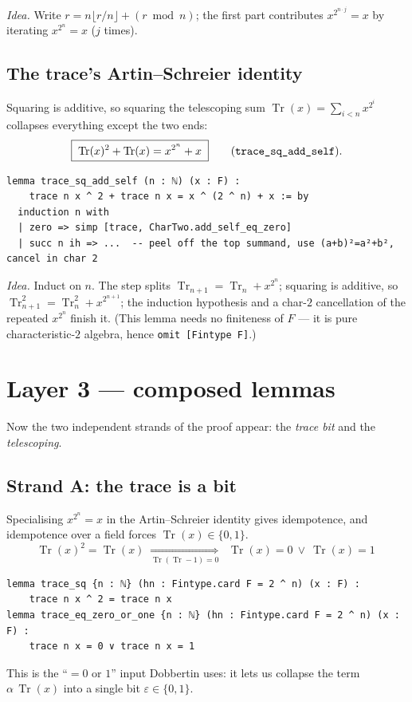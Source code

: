\documentclass[11pt]{article}
\newcommand{\lc}[1]{\texttt{#1}}
\newcommand{\Tr}{\operatorname{Tr}}
\begin{document}
\noindent\emph{Idea.}  Write $r=n\lfloor r/n\rfloor+(r\bmod n)$; the first part
contributes $x^{2^{n\cdot j}}=x$ by iterating $x^{2^n}=x$ ($j$ times).

\subsection{The trace's Artin--Schreier identity}
Squaring is additive, so squaring the telescoping sum $\Tr(x)=\sum_{i<n}x^{2^i}$
collapses everything except the two ends:
\[
  \boxed{\;\Tr(x)^2+\Tr(x)=x^{2^n}+x\;}
  \qquad\text{(\lc{trace\_sq\_add\_self})}.
\]

\begin{lstlisting}
lemma trace_sq_add_self (n : ℕ) (x : F) :
    trace n x ^ 2 + trace n x = x ^ (2 ^ n) + x := by
  induction n with
  | zero => simp [trace, CharTwo.add_self_eq_zero]
  | succ n ih => ...  -- peel off the top summand, use (a+b)²=a²+b², cancel in char 2
\end{lstlisting}

\noindent\emph{Idea.}  Induct on $n$.  The step splits
$\Tr_{n+1}=\Tr_n+x^{2^n}$; squaring is additive, so
$\Tr_{n+1}^2=\Tr_n^2+x^{2^{n+1}}$; the induction hypothesis and a char-$2$
cancellation of the repeated $x^{2^n}$ finish it.  (This lemma needs no
finiteness of $F$ --- it is pure characteristic-$2$ algebra, hence
\lc{omit [Fintype F]}.)

\section{Layer 3 --- composed lemmas}
Now the two independent strands of the proof appear: the \emph{trace bit} and
the \emph{telescoping}.

\subsection{Strand A: the trace is a bit}
Specialising $x^{2^n}=x$ in the Artin--Schreier identity gives idempotence, and
idempotence over a field forces $\Tr(x)\in\{0,1\}$.
\[
  \Tr(x)^2=\Tr(x)
  \;\underset{\Tr(\Tr-1)=0}{\Longrightarrow}\;
  \boxed{\;\Tr(x)=0\ \vee\ \Tr(x)=1\;}
\]
\begin{lstlisting}
lemma trace_sq {n : ℕ} (hn : Fintype.card F = 2 ^ n) (x : F) :
    trace n x ^ 2 = trace n x
lemma trace_eq_zero_or_one {n : ℕ} (hn : Fintype.card F = 2 ^ n) (x : F) :
    trace n x = 0 ∨ trace n x = 1
\end{lstlisting}
This is the ``$=0$ or $1$'' input Dobbertin uses: it lets us collapse the term
$\alpha\,\Tr(x)$ into a single bit $\varepsilon\in\{0,1\}$.
\end{document}
